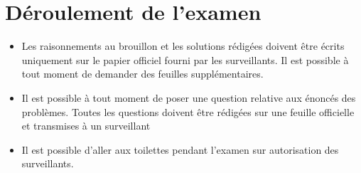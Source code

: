 \documentclass[12pt,a4paper]{article}
\begin{document}
\section{Déroulement de l'examen}
\begin{itemize}

	
	\item Les raisonnements au brouillon et les solutions rédigées doivent être écrits uniquement sur le papier officiel fourni par les surveillants. Il est possible à tout moment de demander des feuilles supplémentaires.
	
	\item Il est possible à tout moment de poser une question relative aux énoncés des problèmes. Toutes les questions doivent être rédigées sur une feuille officielle et transmises à un surveillant
	
	
	
	
	
	
	\item Il est possible d'aller aux toilettes pendant l'examen sur autorisation des surveillants.
	
	
\end{itemize}
\end{document}
